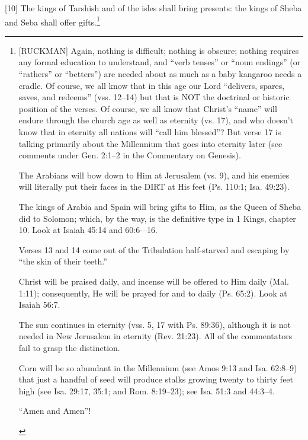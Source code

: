 [10] \textcolor[rgb]{0.00,0.00,1.00}{The kings of Tarshish and of the isles shall bring presents: the kings of Sheba and Seba shall offer gifts.}\footnote{[RUCKMAN] Again, nothing is difficult; nothing is obscure; nothing requires any formal education to understand, and “verb tenses” or “noun endings” (or “rathers” or “betters”) are needed about as much as a baby kangaroo needs a cradle. Of course, we all know that in this age our Lord “delivers, spares, saves, and redeems” (vss. 12--14) but that is NOT the doctrinal or historic position of the verses. Of course, we all know that Christ’s “name” will endure through the church age as well as eternity (vs. 17), and who doesn’t know that in eternity all nations will “call him blessed”? But verse 17 is talking primarily about the Millennium that goes into eternity later (see comments under Gen. 2:1–2 in the Commentary on Genesis).\cite{Ruckman1992Psalms}
\begin{compactenum}
\item The Arabians will bow down to Him at Jerusalem (vs. 9), and his enemies will literally put their faces in the DIRT at His feet (Ps. 110:1; Isa. 49:23).
\item The kings of Arabia and Spain will bring gifts to Him, as the Queen of Sheba did to Solomon; which, by the way, is the definitive type in 1 Kings, chapter 10. Look at Isaiah 45:14 and 60:6-–16.
\item Verses 13 and 14 come out of the Tribulation half-starved and escaping by ``the skin of their teeth.''
\item Christ will be praised daily, and incense will be offered to Him daily (Mal. 1:11); consequently, He will be prayed for and to daily (Ps. 65:2). Look at Isaiah 56:7.
\item The sun continues in eternity (vss. 5, 17 with Ps. 89:36), although it is not needed in New Jerusalem in eternity (Rev. 21:23). All of the commentators fail to grasp the distinction.
\item Corn will be so abundant in the Millennium (see Amos 9:13 and Isa. 62:8--9) that just a handful of seed will produce stalks growing twenty to thirty feet high (see Isa. 29:17, 35:1; and Rom. 8:19--23); see Isa. 51:3 and 44:3--4.
\item “Amen and Amen”!
\end{compactenum} }
